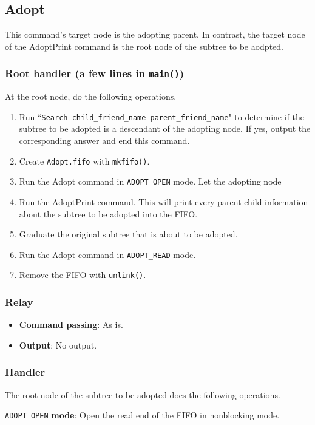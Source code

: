 \documentclass[12pt, a4paper]{article}
\begin{document}
  \subsection{Adopt}
  This command's target node is the adopting parent. In contrast, the target
  node of the AdoptPrint command is the root node of the subtree to be aodpted.

  \subsubsection{Root handler (a few lines in \texttt{main()})}
  At the root node, do the following operations.
  \begin{enumerate}
    \item Run ``\verb|Search child_friend_name parent_friend_name|" to determine if the
    subtree to be adopted is a descendant of the adopting node.
    If yes, output the corresponding answer and end this command.
    \item Create \verb|Adopt.fifo| with \verb|mkfifo()|.
    \item Run the Adopt command in \verb|ADOPT_OPEN| mode.
    Let the adopting node
    \item Run the AdoptPrint command. This will print every parent-child
    information about the subtree to be adopted into the FIFO.
    \item Graduate the original subtree that is about to be adopted.
    \item Run the Adopt command in \verb|ADOPT_READ| mode.
    \item Remove the FIFO with \verb|unlink()|.
  \end{enumerate}

  \subsubsection{Relay}
  \begin{itemize}
    \item \textbf{Command passing}: As is.
    \item \textbf{Output}: No output.
  \end{itemize}

  \subsubsection{Handler}
  The root node of the subtree to be adopted does the following operations.

  \medskip
  \noindent \verb|ADOPT_OPEN| \textbf{mode}: Open the read end of the FIFO in nonblocking mode.
\end{document}
